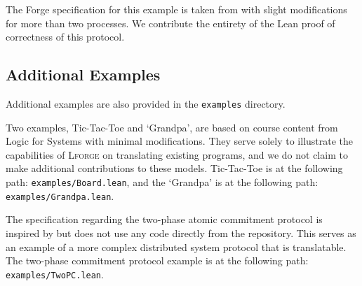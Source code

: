 The Forge specification for this example is taken from \cite{l4s} with slight modifications for more than two processes. We contribute the entirety of the Lean proof of correctness of this protocol. 

\subsection[]{Additional Examples}\label{appendix:additional-examples}
Additional examples are also provided in the \texttt{examples} directory. 

Two examples, Tic-Tac-Toe and `Grandpa', are based on course content from Logic for Systems \cite{l4s} with minimal modifications. They serve solely to illustrate the capabilities of \textsc{Lforge} on translating existing programs, and we do not claim to make additional contributions to these models. Tic-Tac-Toe is at the following path: \texttt{examples/Board.lean}, and the `Grandpa' is at the following path: \texttt{examples/Grandpa.lean}. 

The specification regarding the two-phase atomic commitment protocol is inspired by \cite{distributedforge} but does not use any code directly from the repository. This serves as an example of a more complex distributed system protocol that is translatable. The two-phase commitment protocol example is at the following path: \texttt{examples/TwoPC.lean}. 